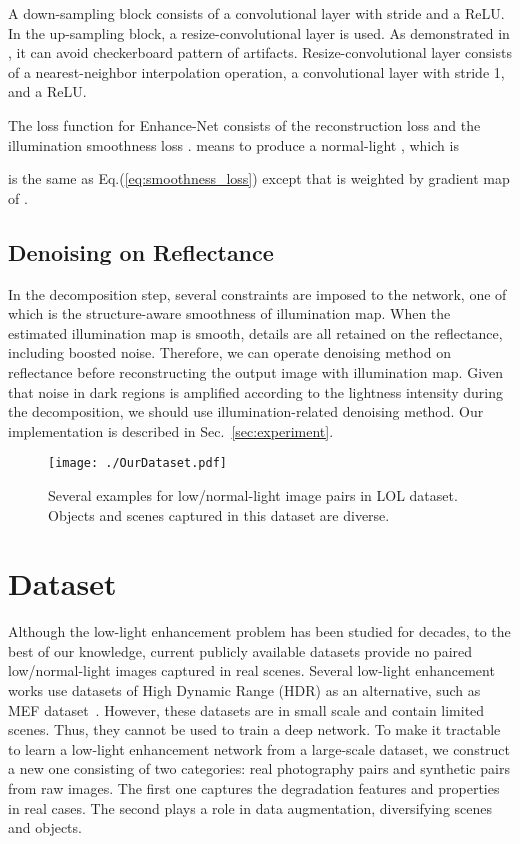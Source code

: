 \documentclass{bmvc2k}
\begin{document}
A down-sampling block consists of a convolutional layer with stride  and a ReLU. In the up-sampling block, a resize-convolutional layer is used. As demonstrated in \cite{46191}, it can avoid checkerboard pattern of artifacts. Resize-convolutional layer consists of a nearest-neighbor interpolation operation, a convolutional layer with stride 1, and a ReLU.

The loss function  for Enhance-Net consists of the reconstruction loss  and the illumination smoothness loss .  means to produce a normal-light , which is

 is the same as Eq.(\ref{eq:smoothness_loss}) except that  is weighted by gradient map of .

\subsection{Denoising on Reflectance}
In the decomposition step, several constraints are imposed to the network, one of which is the structure-aware smoothness of illumination map. When the estimated illumination map is smooth, details are all retained on the reflectance, including boosted noise. Therefore, we can operate denoising method on reflectance before reconstructing the output image with illumination map. Given that noise in dark regions is amplified according to the lightness intensity during the decomposition, we should use illumination-related denoising method. Our implementation is described in Sec.~\ref{sec:experiment}.
\begin{figure}
	\centering
	\begin{minipage}[t]{\linewidth}
		\centering
		\texttt{[image: ./OurDataset.pdf]}
		\end{minipage}
    \vspace{-0.6 cm}
	\caption{Several examples for low/normal-light image pairs in LOL dataset. Objects and scenes captured in this dataset are diverse.}
	\label{fig:ourdataset}
\end{figure}

\section{Dataset} \label{sec:dataset}
Although the low-light enhancement problem has been studied for decades, to the best of our knowledge, current publicly available datasets provide no paired low/normal-light images captured in real scenes. Several low-light enhancement works use datasets of High Dynamic Range (HDR) as an alternative, such as MEF dataset~\cite{Ma2015Perceptual}. However, these datasets are in small scale and contain limited scenes. Thus, they cannot be used to train a deep network. To make it tractable to learn a low-light enhancement network from a large-scale dataset, we construct a new one consisting of two categories: real photography pairs and synthetic pairs from raw images. The first one captures the degradation features and properties in real cases. The second plays a role in data augmentation, diversifying scenes and objects.
\end{document}
